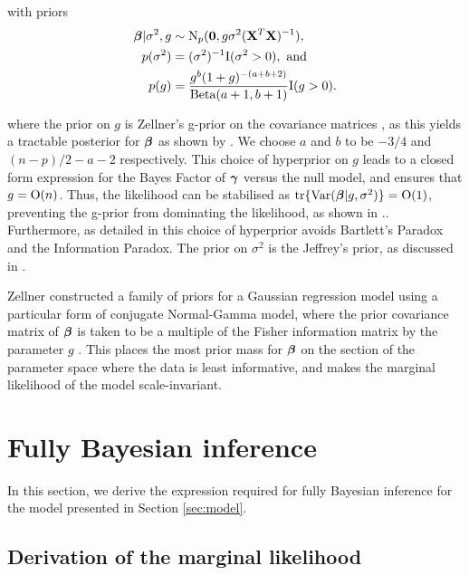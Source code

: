 \documentclass{amsart}[12pt]
\begin{document}
\noindent with priors
\begin{align*}
	{\boldsymbol\beta} | \sigma^2, g & \sim \text{N}_p({\bf 0}, g \sigma^2 ({\bf X}^T {\bf X})^{-1}),                     \\
	p(\sigma^2)          & = (\sigma^2)^{-1} \text{I}(\sigma^2 > 0), \text{ and }                    \\
	p(g)                 & = \frac{g^b (1 + g)^{-(a + b + 2)}}{\text{Beta}(a + 1, b + 1)} \text{I}(g > 0). 
\end{align*}

\noindent where the prior on $g$ is Zellner's g-prior on the covariance matrices \citep{Goel1986}, as this
yields a tractable posterior for ${\boldsymbol \beta}$ as shown by \citep{Liang2008}. We choose $a$  and $b$ to be $-3/4$
and $(n - p)/2 - a - 2$ respectively. This choice of hyperprior on $g$ leads to a closed form expression for
the Bayes Factor of ${\boldsymbol \gamma}$ versus the null model, and ensures that $g = \text{O}(n)$. Thus, the likelihood can
be stabilised as $\text{tr}\{\text{Var}({\boldsymbol \beta} | g, \sigma^2)\} = \text{O}(1)$, preventing the g-prior from dominating the
likelihood, as shown in \citep{Maruyama2011}.. Furthermore, as detailed in \citep{Liang2008} this choice of
hyperprior avoids Bartlett's Paradox and the Information Paradox. The prior on $\sigma^2$ is the Jeffrey's
prior, as discussed in \citep{Berger2012}.

Zellner constructed a family of priors for a Gaussian regression model using a particular form of conjugate
Normal-Gamma model, where the prior covariance matrix of ${\boldsymbol \beta}$ is taken to be a multiple of the Fisher
information  matrix by the parameter $g$ \citep{Goel1986}. This places the most prior mass for ${\boldsymbol \beta}$ on the
section of the parameter space where the data is least informative, and makes the marginal likelihood of the
model scale-invariant.

\section{Fully Bayesian inference}
\label{sec:full_bayes}

In this section, we derive the expression required for fully Bayesian inference for the model presented in
Section \ref{sec:model}. 

\subsection{Derivation of the marginal likelihood}


\end{document}
